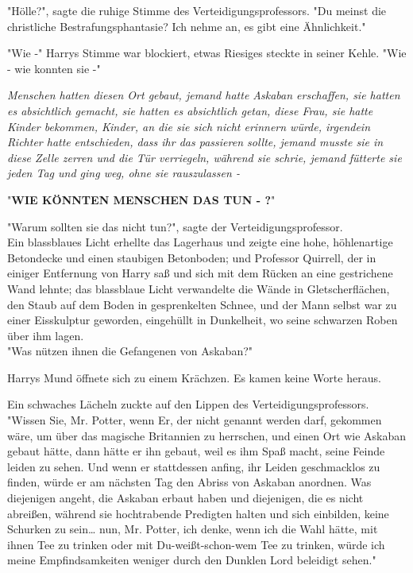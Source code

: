 {"Hölle?", sagte die ruhige Stimme des Verteidigungsprofessors. "Du meinst die christliche Bestrafungsphantasie? Ich nehme an, es gibt eine Ähnlichkeit."

"Wie -" Harrys Stimme war blockiert, etwas Riesiges steckte in seiner Kehle. "Wie - wie konnten sie -"

\emph{Menschen hatten diesen Ort gebaut, jemand hatte Askaban erschaffen, sie hatten es absichtlich gemacht, sie hatten es absichtlich getan, diese Frau, sie hatte Kinder bekommen, Kinder, an die sie sich nicht erinnern würde, irgendein Richter hatte} \emph{entschieden, dass ihr das passieren sollte, jemand musste sie in diese Zelle zerren und die Tür verriegeln, während sie schrie, jemand fütterte sie} \emph{jeden Tag und ging weg, ohne sie rauszulassen -}

"\textbf{WIE KÖNNTEN MENSCHEN DAS TUN - ?}"

"Warum sollten sie das nicht tun?", sagte der Verteidigungsprofessor.\\ Ein blassblaues Licht erhellte das Lagerhaus und zeigte eine hohe, höhlenartige Betondecke und einen staubigen Betonboden; und Professor Quirrell, der in einiger Entfernung von Harry saß und sich mit dem Rücken an eine gestrichene Wand lehnte; das blassblaue Licht verwandelte die Wände in Gletscherflächen, den Staub auf dem Boden in gesprenkelten Schnee, und der Mann selbst war zu einer Eisskulptur geworden, eingehüllt in Dunkelheit, wo seine schwarzen Roben über ihm lagen.\\ "Was nützen ihnen die Gefangenen von Askaban?"

Harrys Mund öffnete sich zu einem Krächzen. Es kamen keine Worte heraus.

Ein schwaches Lächeln zuckte auf den Lippen des Verteidigungsprofessors.\\ "Wissen Sie, Mr. Potter, wenn Er, der nicht genannt werden darf, gekommen wäre, um über das magische Britannien zu herrschen, und einen Ort wie Askaban gebaut hätte, dann hätte er ihn gebaut, weil es ihm Spaß macht, seine Feinde leiden zu sehen. Und wenn er stattdessen anfing, ihr Leiden geschmacklos zu finden, würde er am nächsten Tag den Abriss von Askaban anordnen. Was diejenigen angeht, die Askaban erbaut haben und diejenigen, die es nicht abreißen, während sie hochtrabende Predigten halten und sich einbilden, keine Schurken zu sein… nun, Mr. Potter, ich denke, wenn ich die Wahl hätte, mit ihnen Tee zu trinken oder mit Du-weißt-schon-wem Tee zu trinken, würde ich meine Empfindsamkeiten weniger durch den Dunklen Lord beleidigt sehen."

}
